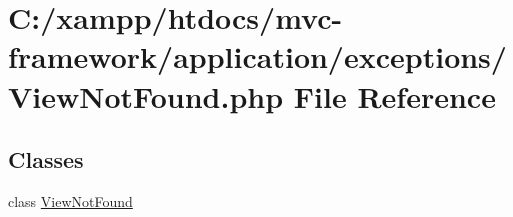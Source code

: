 \hypertarget{_view_not_found_8php}{}\section{C\+:/xampp/htdocs/mvc-\/framework/application/exceptions/\+View\+Not\+Found.php File Reference}
\label{_view_not_found_8php}
\subsection*{Classes}
\begin{DoxyCompactItemize}
\item 
class \hyperlink{class_view_not_found}{View\+Not\+Found}
\end{DoxyCompactItemize}
